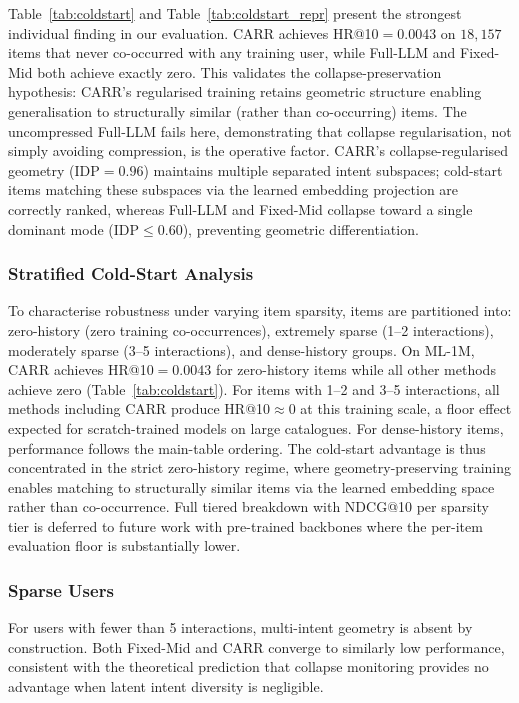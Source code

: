 \documentclass[lettersize,journal]{IEEEtran}
\begin{document}
Table~\ref{tab:coldstart} and Table~\ref{tab:coldstart_repr} present the strongest individual finding in our evaluation. CARR achieves HR@10$=0.0043$ on $18{,}157$ items that never co-occurred with any training user, while Full-LLM and Fixed-Mid both achieve exactly zero. This validates the collapse-preservation hypothesis: CARR's regularised training retains geometric structure enabling generalisation to structurally similar (rather than co-occurring) items. The uncompressed Full-LLM fails here, demonstrating that collapse regularisation, not simply avoiding compression, is the operative factor. CARR's collapse-regularised geometry ($\mathrm{IDP}=0.96$) maintains multiple separated intent subspaces; cold-start items matching these subspaces via the learned embedding projection are correctly ranked, whereas Full-LLM and Fixed-Mid collapse toward a single dominant mode ($\mathrm{IDP} \leq 0.60$), preventing geometric differentiation.

\subsubsection{Stratified Cold-Start Analysis}
To characterise robustness under varying item sparsity, items are partitioned into: zero-history (zero training co-occurrences), extremely sparse (1--2 interactions), moderately sparse (3--5 interactions), and dense-history groups. On ML-1M, CARR achieves HR@10$=0.0043$ for zero-history items while all other methods achieve zero (Table~\ref{tab:coldstart}). For items with 1--2 and 3--5 interactions, all methods including CARR produce HR@10$\approx 0$ at this training scale, a floor effect expected for scratch-trained models on large catalogues. For dense-history items, performance follows the main-table ordering. The cold-start advantage is thus concentrated in the strict zero-history regime, where geometry-preserving training enables matching to structurally similar items via the learned embedding space rather than co-occurrence. Full tiered breakdown with NDCG@10 per sparsity tier is deferred to future work with pre-trained backbones where the per-item evaluation floor is substantially lower.

\subsubsection{Sparse Users}
For users with fewer than 5 interactions, multi-intent geometry is absent by construction. Both Fixed-Mid and CARR converge to similarly low performance, consistent with the theoretical prediction that collapse monitoring provides no advantage when latent intent diversity is negligible.
\end{document}
